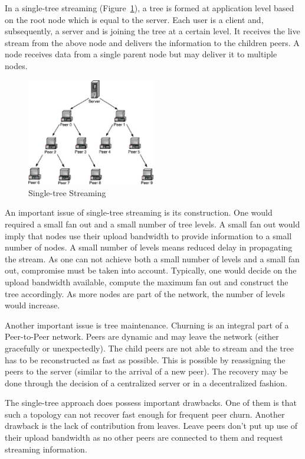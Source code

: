 In a single-tree streaming
(Figure~\ref{fig:p2p-systems:single-tree-streaming}), a tree is formed at
application level based on the root node which is equal to the server. Each
user is a client and, subsequently, a server and is joining the tree at a
certain level. It receives the live stream from the above node and delivers
the information to the children peers. A node receives data from a single
parent node but may deliver it to multiple nodes.

\begin{figure}
  \centering
  \includegraphics[width=0.5\textwidth]{src/img/p2p-systems/single-tree-streaming}
  \caption{Single-tree Streaming}
  \label{fig:p2p-systems:single-tree-streaming}
\end{figure}

An important issue of single-tree streaming is its construction. One would
required a small fan out and a small number of tree levels. A small fan out
would imply that nodes use their upload bandwidth to provide information to a
small number of nodes. A small number of levels means reduced delay in
propagating the stream. As one can not achieve both a small number of
levels and a small fan out, compromise must be taken into account. Typically,
one would decide on the upload bandwidth available, compute the maximum fan
out and construct the tree accordingly. As more nodes are part of the network,
the number of levels would increase.

Another important issue is tree maintenance. Churning is an integral part of
a Peer-to-Peer network. Peers are dynamic and may leave the network (either
gracefully or unexpectedly). The child peers are not able to stream and the
tree has to be reconstructed as fast as possible. This is possible by
reassigning the peers to the server (similar to the arrival of a new peer).
The recovery may be done through the decision of a centralized server or in a
decentralized fashion.

The single-tree approach does possess important drawbacks. One of them is that
such a topology can not recover fast enough for frequent peer churn. Another
drawback is the lack of contribution from leaves. Leave peers don't put up use
of their upload bandwidth as no other peers are connected to them and request
streaming information.

